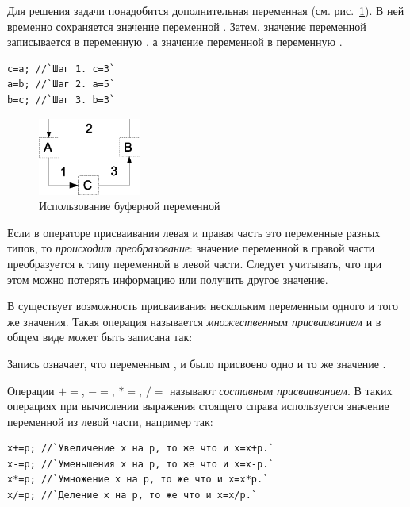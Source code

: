 
Для решения задачи понадобится дополнительная переменная  (см. рис.~\ref{ch02:refDrawing0}). 
В ней временно сохраняется значение переменной . Затем, значение переменной
 записывается в переменную , а значение переменной  в
переменную .
\begin{lstlisting}
c=a; //`Шаг 1. с=3`
a=b; //`Шаг 2. a=5`
b=c; //`Шаг 3. b=3`
\end{lstlisting}

\begin{figure}[htb]
\begin{center}
\includegraphics[width=0.3\textwidth]{img/ris_2_1}
\caption{Использование буферной переменной}
\label{ch02:refDrawing0}
\end{center}
\end{figure}

Если в операторе присваивания левая и правая часть это переменные разных типов, то \emph{происходит
преобразование}: значение переменной в правой части преобразуется к типу переменной в левой части. Следует учитывать,
что при этом можно потерять информацию или получить другое значение.

В  существует возможность присваивания нескольким переменным одного и того же значения. Такая операция называется
\emph{множественным присваиванием} и в общем виде может быть
записана так:


Запись 
означает, что переменным ,  и  было присвоено одно и то же
значение .

Операции $+=$, $-=$, $*=$, $/=$ называют \emph{составным присваиванием}. В
таких операциях при вычислении выражения стоящего справа используется значение переменной из левой части, например так:
\begin{lstlisting}
x+=p; //`Увеличение x на p, то же что и x=x+p.`
x-=p; //`Уменьшения x на p, то же что и x=x-p.`
x*=p; //`Умножение x на p, то же что и x=x*p.`
x/=p; //`Деление x на p, то же что и x=x/p.`
\end{lstlisting}

